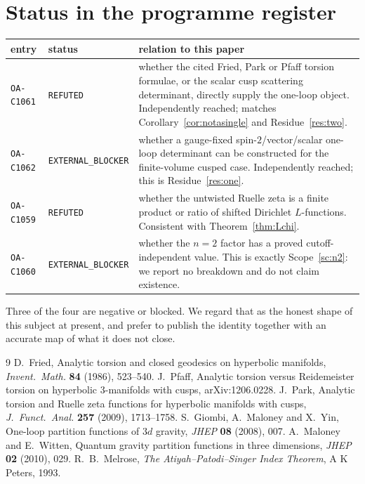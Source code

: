 \documentclass[11pt,a4paper]{article}
\theoremstyle{definition}
\theoremstyle{remark}
\begin{document}
\section{Status in the programme register}\label{app:register}

\begin{center}
\begin{tabular}{@{}llp{6.9cm}@{}}
\toprule
entry & status & relation to this paper \\
\midrule
\texttt{OA-C1061} & \texttt{REFUTED} & whether the cited Fried, Park or Pfaff torsion formulae, or the scalar cusp scattering determinant, directly supply the one-loop object. Independently reached; matches Corollary~\ref{cor:notasingle} and Residue~\ref{res:two}. \\
\texttt{OA-C1062} & \texttt{EXTERNAL\_BLOCKER} & whether a gauge-fixed spin-$2$/vector/scalar one-loop determinant can be constructed for the finite-volume cusped case. Independently reached; this is Residue~\ref{res:one}. \\
\texttt{OA-C1059} & \texttt{REFUTED} & whether the untwisted Ruelle zeta is a finite product or ratio of shifted Dirichlet $L$-functions. Consistent with Theorem~\ref{thm:Lchi}. \\
\texttt{OA-C1060} & \texttt{EXTERNAL\_BLOCKER} & whether the $n=2$ factor has a proved cutoff-independent value. This is exactly Scope~\ref{sc:n2}: we report no breakdown and do not claim existence. \\
\bottomrule
\end{tabular}
\end{center}

\noindent
Three of the four are negative or blocked. We regard that as the honest shape of this subject at
present, and prefer to publish the identity together with an accurate map of what it does not
close.

\begin{thebibliography}{9}
 D.~Fried, Analytic torsion and closed geodesics on hyperbolic manifolds,
  \emph{Invent.\ Math.} \textbf{84} (1986), 523--540.
 J.~Pfaff, Analytic torsion versus Reidemeister torsion on hyperbolic
  $3$-manifolds with cusps, arXiv:1206.0228.
 J.~Park, Analytic torsion and Ruelle zeta functions for hyperbolic manifolds
  with cusps, \emph{J.\ Funct.\ Anal.} \textbf{257} (2009), 1713--1758.
 S.~Giombi, A.~Maloney and X.~Yin, One-loop partition functions of $3d$ gravity,
  \emph{JHEP} \textbf{08} (2008), 007.
 A.~Maloney and E.~Witten, Quantum gravity partition functions in three
  dimensions, \emph{JHEP} \textbf{02} (2010), 029.
 R.~B.~Melrose, \emph{The Atiyah--Patodi--Singer Index Theorem}, A K Peters,
  1993.
\end{thebibliography}
\end{document}
